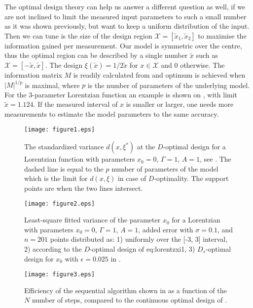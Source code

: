 \documentclass[12pt]{iopart}
\begin{document}
The optimal design theory can help us answer a different question as well, if we are not inclined to limit the measured input parameters to such a small number as it was shown previously, but want to keep a uniform distribution of the input. Then we can tune is the size of the design region $\mathcal{X} = [\tilde x_1, \tilde x_2]$ to maximise the information gained per measurement. Our model is symmetric over the centre, thus the optimal region can be described by a single number $\tilde x$ such as $\mathcal{X} = [-\tilde x, \tilde x]$. The design $\xi(\tilde x) = 1/{2 \tilde x}$ for $x \in \mathcal{X}$ and $0$ otherwise. The information matrix $M$ is readily calculated from  and optimum is achieved when $|M|^{1/p}$ is maximal, where $p$ is the number of parameters of the underlying model. For the 3-parameter Lorentzian function an example is shown on , with limit $\tilde x = 1.124$. If the measured interval of $x$ is smaller or larger, one needs more measurements to estimate the model parameters to the same accuracy.

\begin{figure}
\texttt{[image: figure1.eps]}
\caption{The standardized variance $d(x, \xi^*)$ at the $D$-optimal design for a Lorentzian function with parameters $x_0=0$, $\Gamma = 1$, $A = 1$, see . The dashed line is equal to the $p$ number of parameters of the model which is the limit for $d(x, \xi)$ in case of $D$-optimality. The support points are when the two lines intersect.}
\label{fig:lorentz3d}
\end{figure}

\begin{figure}
\texttt{[image: figure2.eps]}
\caption{Least-square fitted variance of the parameter $x_0$ for a Lorentzian with parameters $x_0=0$, $\Gamma = 1$, $A = 1$, added error with $\sigma=0.1$, and $n=201$ points distributed as: 1) uniformly over the [-3, 3] interval, 2) according to the $D$-optimal design of {eq:lorentzxi1}, 3) $D_s$-optimal design for $x_0$ with $\epsilon = 0.025$ in .}
\label{fig:simvariance}
\end{figure}

\begin{figure}
\texttt{[image: figure3.eps]}
\caption{Efficiency of the sequential algorithm shown in  as a function of the $N$ number of steps, compared to the continuous optimal design of .}
\label{fig:xinefficiency}
\end{figure}
\end{document}
